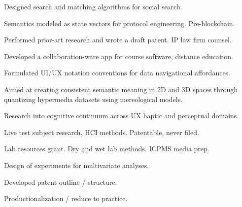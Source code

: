 \documentclass[letterpaper]{deedy-resume} %
\begin{document}
\begin{minipage}[t]{1\textwidth}
\sectionspace %





\begin{tightitemize}
\item Designed search and matching algorithms for social search.
\item Semantics modeled as state vectors for protocol engineering.  Pre-blockchain.
\item Performed prior-art research and wrote a draft patent. IP law firm counsel.
\item Developed a collaboration-ware app for course software, distance education.
\end{tightitemize}

\sectionspace %



\begin{tightitemize}
\item Formulated UI/UX notation conventions for data navigational affordances.
\item Aimed at creating consistent semantic meaning in 2D and 3D spaces through quantizing hypermedia datasets using mereological models.
\item Research into cognitive continuum across UX haptic and perceptual domains.
\item Live test subject research, HCI methods.  Patentable, never filed.
\end{tightitemize}

\sectionspace %




\begin{tightitemize}
\item Lab resources grant. Dry and wet lab methods. ICPMS media prep.
\item Design of experiments for multivariate analyses.
\item Developed patent outline / structure.
\item Productionalization / reduce to practice. 
\end{tightitemize}

\sectionspace %





\end{minipage} %

\end{document}
